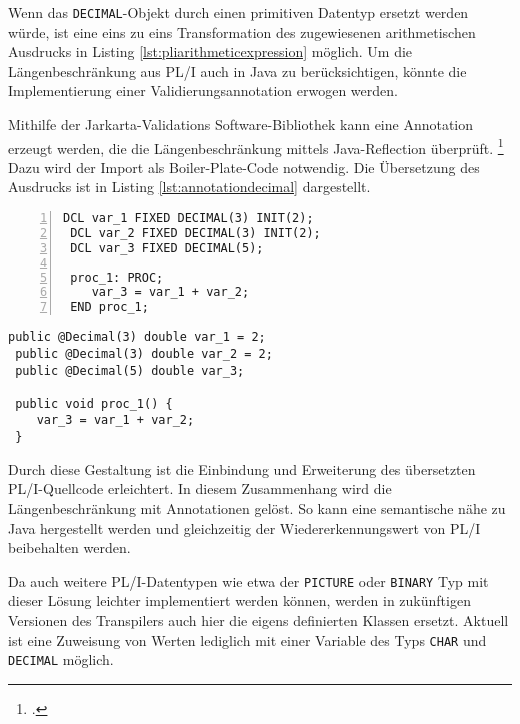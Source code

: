 Wenn das \verb+DECIMAL+-Objekt durch einen primitiven Datentyp ersetzt werden würde, ist eine eins zu eins Transformation des zugewiesenen arithmetischen Ausdrucks in Listing \ref{lst:pliarithmeticexpression} möglich. Um die Längenbeschränkung aus PL/I auch in Java zu berücksichtigen, könnte die Implementierung einer Validierungsannotation erwogen werden.

Mithilfe der Jarkarta-Validations Software-Bibliothek kann eine Annotation erzeugt werden, die die Längenbeschränkung mittels Java-Reflection überprüft. \footcite[Vgl. ][]{jakarta}
Dazu wird der Import als Boiler-Plate-Code  notwendig. 
Die Übersetzung des Ausdrucks ist in Listing \ref{lst:annotationdecimal} dargestellt.

\begin{minipage}[b]{0.48\linewidth}
	\centering
	\lstset{language=PL/I,label=SliceExaple}
	\begin{lstlisting}[frame=single, numbers=left, mathescape,%
		caption={Annotationslösung}, label={lst:annotationdecimal},
		basicstyle=\fontsize{9}{13}\selectfont\ttfamily]
 DCL var_1 FIXED DECIMAL(3) INIT(2);
 DCL var_2 FIXED DECIMAL(3) INIT(2);
 DCL var_3 FIXED DECIMAL(5);
		
 proc_1: PROC;
	var_3 = var_1 + var_2;
 END proc_1;
	\end{lstlisting}
\end{minipage}
\hspace{0.5cm}
\begin{minipage}[b]{0.48\linewidth}
	\centering
	\lstset{language=Java,label=SliceExaple}
	\begin{lstlisting}[frame=single, mathescape,%
		title={" "},
		basicstyle=\fontsize{9}{13}\selectfont\ttfamily]
 public @Decimal(3) double var_1 = 2;
 public @Decimal(3) double var_2 = 2;
 public @Decimal(5) double var_3;
		
 public void proc_1() {
 	var_3 = var_1 + var_2;
 }
	\end{lstlisting}
\end{minipage}

Durch diese Gestaltung ist die Einbindung und Erweiterung des übersetzten PL/I-Quellcode erleichtert. In diesem Zusammenhang wird die Längenbeschränkung mit Annotationen gelöst. 
So kann eine semantische nähe zu Java hergestellt werden und gleichzeitig der Wiedererkennungswert von PL/I beibehalten werden.

Da auch weitere PL/I-Datentypen wie etwa der \verb+PICTURE+ oder \verb+BINARY+ Typ mit dieser Lösung leichter implementiert werden können, werden in zukünftigen Versionen des Transpilers auch hier die eigens definierten Klassen ersetzt.
Aktuell ist eine Zuweisung von Werten lediglich mit einer Variable des Typs \verb+CHAR+ und \verb+DECIMAL+ möglich.


